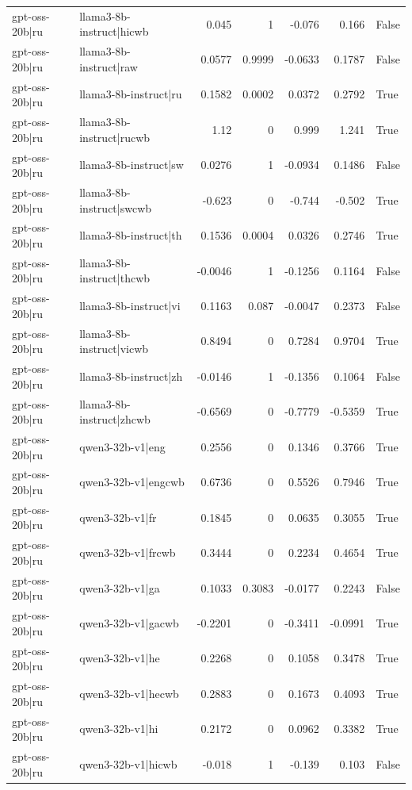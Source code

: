 \begin{table}
\begin{tabular}{l l r r r r l}
gpt-oss-20b|ru & llama3-8b-instruct|hicwb & 0.045 & 1 & -0.076 & 0.166 & False \\
gpt-oss-20b|ru & llama3-8b-instruct|raw & 0.0577 & 0.9999 & -0.0633 & 0.1787 & False \\
gpt-oss-20b|ru & llama3-8b-instruct|ru & 0.1582 & 0.0002 & 0.0372 & 0.2792 & True \\
gpt-oss-20b|ru & llama3-8b-instruct|rucwb & 1.12 & 0 & 0.999 & 1.241 & True \\
gpt-oss-20b|ru & llama3-8b-instruct|sw & 0.0276 & 1 & -0.0934 & 0.1486 & False \\
gpt-oss-20b|ru & llama3-8b-instruct|swcwb & -0.623 & 0 & -0.744 & -0.502 & True \\
gpt-oss-20b|ru & llama3-8b-instruct|th & 0.1536 & 0.0004 & 0.0326 & 0.2746 & True \\
gpt-oss-20b|ru & llama3-8b-instruct|thcwb & -0.0046 & 1 & -0.1256 & 0.1164 & False \\
gpt-oss-20b|ru & llama3-8b-instruct|vi & 0.1163 & 0.087 & -0.0047 & 0.2373 & False \\
gpt-oss-20b|ru & llama3-8b-instruct|vicwb & 0.8494 & 0 & 0.7284 & 0.9704 & True \\
gpt-oss-20b|ru & llama3-8b-instruct|zh & -0.0146 & 1 & -0.1356 & 0.1064 & False \\
gpt-oss-20b|ru & llama3-8b-instruct|zhcwb & -0.6569 & 0 & -0.7779 & -0.5359 & True \\
gpt-oss-20b|ru & qwen3-32b-v1|eng & 0.2556 & 0 & 0.1346 & 0.3766 & True \\
gpt-oss-20b|ru & qwen3-32b-v1|engcwb & 0.6736 & 0 & 0.5526 & 0.7946 & True \\
gpt-oss-20b|ru & qwen3-32b-v1|fr & 0.1845 & 0 & 0.0635 & 0.3055 & True \\
gpt-oss-20b|ru & qwen3-32b-v1|frcwb & 0.3444 & 0 & 0.2234 & 0.4654 & True \\
gpt-oss-20b|ru & qwen3-32b-v1|ga & 0.1033 & 0.3083 & -0.0177 & 0.2243 & False \\
gpt-oss-20b|ru & qwen3-32b-v1|gacwb & -0.2201 & 0 & -0.3411 & -0.0991 & True \\
gpt-oss-20b|ru & qwen3-32b-v1|he & 0.2268 & 0 & 0.1058 & 0.3478 & True \\
gpt-oss-20b|ru & qwen3-32b-v1|hecwb & 0.2883 & 0 & 0.1673 & 0.4093 & True \\
gpt-oss-20b|ru & qwen3-32b-v1|hi & 0.2172 & 0 & 0.0962 & 0.3382 & True \\
gpt-oss-20b|ru & qwen3-32b-v1|hicwb & -0.018 & 1 & -0.139 & 0.103 & False \\

\end{tabular}
\end{table}
